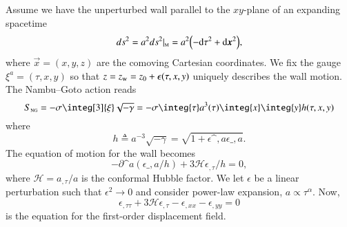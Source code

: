 
Assume we have the unperturbed wall parallel to the $xy$-plane of an expanding spacetime
\begin{equation}
    {ds}^2 = a^2 {ds}^2\rvert\nped{M} = a^2 \pclosed{- {\diff \tau}^2 + {\diff \vec{x}}^2  }, 
\end{equation}
where $\vec{x}=(x,y,z)$ are the comoving Cartesian coordinates. %
We fix the gauge $ \xi^a = (\tau, x, y)$ so that $z=z_\mathrm{w}=z_0+\epsilon(\tau, x, y) $ uniquely describes the wall motion. 
The Nambu--Goto action reads
\begin{equation}\label{eq:pertwalls:thinwall:Nambu_Goto_action_dw_FLRW}
    S\nped{NG} = -\sigma \integ[3]{\xi} \sqrt{-\gamma} = - \sigma \integ{\tau}a^3(\tau)\integ{x}\integ{y}  h(\tau,x,y)
\end{equation}
where 
\begin{equation}
    h \triangleq a^{-3}\sqrt{-\gamma}%
    = \sqrt{1 + \epsilon\^{,a}\epsilon\_{,a} }.
\end{equation}
The equation of motion for the wall becomes~\citep{vilenkinCosmicStringsOther1994}
\begin{equation}\label{eq:pertwalls:thinwall:eom_domain_wall_FLRW}
    -\partial\^a ( \epsilon\_{,a}/h) + 3 \mathcal{H} \epsilon_{,\tau} /h = 0,
\end{equation}
where $\mathcal{H}= a_{,\tau}/a$ is the conformal Hubble factor. %
We let $\epsilon$ be a linear perturbation such that $\epsilon^2 \to 0$ %
and consider power-law expansion, $a\propto \tau^\alpha$. 
Now,
\begin{equation}\label{eq:pertwalls:thinwall:epsilon_eom_simple}
    \epsilon_{,\tau\tau} + 3\mathcal{H} \epsilon_{,\tau} - \epsilon_{,xx} - \epsilon_{,yy} = 0
\end{equation}
is the equation for the first-order displacement field. %
